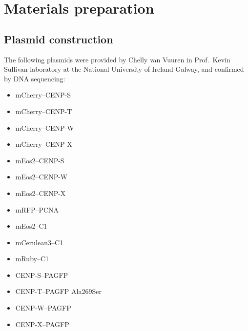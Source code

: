 \section{Materials preparation}

  \subsection{Plasmid construction}

    The following plasmids were provided by Chelly van Vuuren in
    Prof.~Kevin Sullivan laboratory at the National University of
    Ireland Galway, and confirmed by DNA sequencing:

    \begin{itemize}
      \item mCherry--CENP-S
      \item mCherry--CENP-T
      \item mCherry--CENP-W
      \item mCherry--CENP-X
      \item mEos2--CENP-S
      \item mEos2--CENP-W
      \item mEos2--CENP-X
      \item mRFP--PCNA
      \item mEos2--C1
      \item mCerulean3--C1
      \item mRuby--C1
      \item CENP-S--PAGFP
      \item CENP-T--PAGFP Ala269Ser
      \item CENP-W--PAGFP
      \item CENP-X--PAGFP
    \end{itemize}

